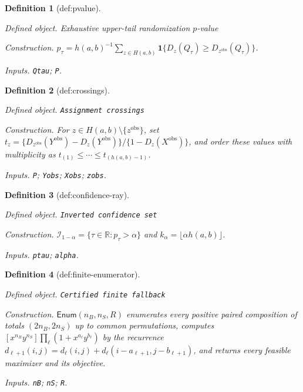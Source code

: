 \documentclass{article}
\newtheorem{definition}{Definition}
\begin{document}
\begin{definition}[def:pvalue]\label{def:pvalue}
\par\smallskip\noindent\emph{Defined object.} Exhaustive upper-tail randomization \(p\)-value
\par\smallskip\noindent\emph{Construction.} \(p_\tau=h(a,b)^{-1}\sum_{z\in H(a,b)}\mathbf 1\{D_z(Q_\tau)\ge D_{z^{\mathrm{obs}}}(Q_\tau)\}\).
\par\smallskip\noindent\emph{Inputs.} \texttt{Qtau}; \texttt{P}.
\end{definition}

\begin{definition}[def:crossings]\label{def:crossings}
\par\smallskip\noindent\emph{Defined object.} \texttt{Assignment crossings}
\par\smallskip\noindent\emph{Construction.} For \(z\in H(a,b)\setminus\{z^{\mathrm{obs}}\}\), set \(t_z=\{D_{z^{\mathrm{obs}}}(Y^{\mathrm{obs}})-D_z(Y^{\mathrm{obs}})\}/\{1-D_z(X^{\mathrm{obs}})\}\), and order these values with multiplicity as \(t_{(1)}\le\cdots\le t_{(h(a,b)-1)}\).
\par\smallskip\noindent\emph{Inputs.} \texttt{P}; \texttt{Yobs}; \texttt{Xobs}; \texttt{zobs}.
\end{definition}

\begin{definition}[def:confidence-ray]\label{def:confidence-ray}
\par\smallskip\noindent\emph{Defined object.} \texttt{Inverted confidence set}
\par\smallskip\noindent\emph{Construction.} \(\mathcal I_{1-\alpha}=\{\tau\in\mathbb R:p_\tau>\alpha\}\) and \(k_\alpha=\lfloor\alpha h(a,b)\rfloor\).
\par\smallskip\noindent\emph{Inputs.} \texttt{ptau}; \texttt{alpha}.
\end{definition}

\begin{definition}[def:finite-enumerator]\label{def:finite-enumerator}
\par\smallskip\noindent\emph{Defined object.} \texttt{Certified finite fallback}
\par\smallskip\noindent\emph{Construction.} \(\mathsf{Enum}(n_B,n_S,R)\) enumerates every positive paired composition of totals \((2n_B,2n_S)\) up to common permutations, computes \([x^{n_B}y^{n_S}]\prod_\ell(1+x^{a_\ell}y^{b_\ell})\) by the recurrence \(d_{\ell+1}(i,j)=d_\ell(i,j)+d_\ell(i-a_{\ell+1},j-b_{\ell+1})\), and returns every feasible maximizer and its objective.
\par\smallskip\noindent\emph{Inputs.} \texttt{nB}; \texttt{nS}; \texttt{R}.
\end{definition}
\end{document}
